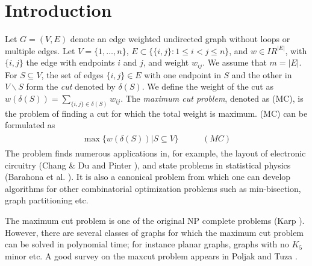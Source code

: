 \documentclass[12pt]{article}
\newcommand{\real}{I\!\!R}
\begin{document}
\section{Introduction}

Let $G = (V,E)$ denote an edge weighted undirected graph without
loops or multiple edges. Let $V = \{1,\ldots,n\}$, $E \subset \{
\{i,j\} : 1 \le i < j \le n\}$, and $w \in \real^{|E|}$, with
$\{i,j\}$ the edge with endpoints $i$ and $j$, and weight
$w_{ij}$. We assume that $m = |E|$. For $S \subseteq V$, the set
of edges $\{i,j\} \in E$ with one endpoint in $S$ and the other in
$V \backslash S$ form the {\em cut} denoted by $\delta(S)$. We
define the weight of the cut as $w(\delta(S)) = \displaystyle
\sum_{\{i,j\} \in \delta(S)} w_{ij}$. The {\em maximum cut
problem}, denoted as (MC), is the problem of finding a cut for
which the total weight is maximum. (MC) can be formulated as
\begin{eqnarray}
\begin{array}{cc}
\max \{w(\delta(S)) | S \subseteq V \} & \qquad(MC)
\end{array}
\end{eqnarray}
The problem finds numerous applications in, for example, the layout of
electronic circuitry (Chang \& Du \cite{chang_du} and Pinter
\cite{pinter}), and state problems in statistical physics (Barahona et
al. \cite{barahona_et_al}). It is also a canonical problem from
which one can develop algorithms for other combinatorial
optimization problems such as min-bisection, graph partitioning
etc.

The maximum cut problem is one of the original NP complete
problems (Karp \cite{karp1}). However, there are several classes
of graphs for which the maximum cut problem can be solved in
polynomial time; for instance planar graphs, graphs with no $K_5$
minor etc. A good survey on the maxcut problem appears in Poljak
and Tuza \cite{poljak3}.
\end{document}
